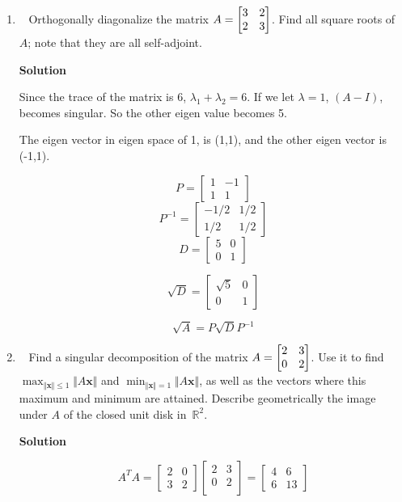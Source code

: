 \documentclass[11pt]{article}
\makeatletter
\newcommand\score[1]{\marginpar{\vspace{-2ex}\color{blue}{#1/3}}\hspace{-1ex}}
\newcommand\0{\mathbf{0}}
\newcommand\RR{\mathbb{R}}
\newcommand\xx{\mathbf{x}}
\newcommand\<{\langle}
\renewcommand\>{\rangle}
\newcommand\twobytwo[1]{\left[\begin{array}{@{}cc@{}}#1\end{array}\right]}
\makeatother
\begin{document}
\begin{enumerate}
$$x^T A x \geq 0 \; \forall x$$

Now we want to show that $\alpha$A+$(1-\alpha)$B, also satisfies this property.

$$x^{T}(\alpha A+ (1-\alpha) B)x = \alpha x^T Ax + (1-\alpha) x^T Bx \geq 0 \; \forall x \wedge 0 \leq \alpha \leq 1$$

So the real positive matrices are convex. This proof also works for conjugate transposes too.



\item\ \score{}%
Orthogonally diagonalize the matrix $A = \twobytwo{3&2\\2&3}$.  Find
all square roots of~$A$; note that they are all self-adjoint.

\textbf{Solution}

Since the trace of the matrix is 6, $\lambda_1 + \lambda_2 = 6$. If we let
$\lambda=1$, $(A-I)$, becomes singular. So the other eigen value becomes 5.

The eigen vector in eigen space of 1, is (1,1), and the other eigen vector is (-1,1).

$$
P=
\begin{bmatrix}
  1&-1\\
  1& 1
\end{bmatrix}
$$
$$
P^{-1}=
\begin{bmatrix}
  -1/2& 1/2\\
  1/2& 1/2
\end{bmatrix}
$$
$$
D=
\begin{bmatrix}
  5& 0\\
  0& 1
\end{bmatrix}
$$

$$
\sqrt{D}=
\begin{bmatrix}
  \sqrt{5}&0\\
  0& 1
\end{bmatrix}
$$

$$
\sqrt{A}=P\sqrt{D}P^{-1}
$$

\item\ \score{}%
Find a singular decomposition of the matrix $A = \twobytwo{2&3\\0&2}$.
Use it to find $\max_{\Vert\xx\Vert \leq 1} \Vert A\xx\Vert$ and
$\min_{\Vert\xx\Vert = 1} \Vert A\xx\Vert$, as well as the vectors
where this maximum and minimum are attained.  Describe geometrically
the image under $A$ of the closed unit disk in~$\RR^2$.

\textbf{Solution}

$$
A^{T}A=
\begin{bmatrix}
 2& 0\\
 3& 2 
\end{bmatrix}
\begin{bmatrix}
  2&3\\
  0&2\\
\end{bmatrix}
=
\begin{bmatrix}
  4&6\\
  6&13
\end{bmatrix}
$$


\end{enumerate}
\end{document}
